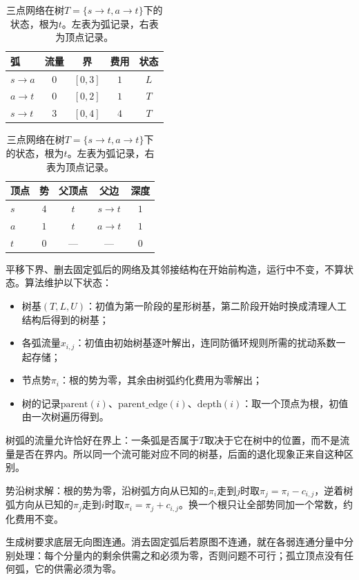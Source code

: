 \begin{table}[!htb]
  \centering\small
  \begin{tabular}{@{}lcccc@{}}
    \toprule
    弧 & 流量 & 界 & 费用 & 状态 \\
    \midrule
    $s\to a$ & $0$ & $[0,3]$ & $1$ & $L$ \\
    $a\to t$ & $0$ & $[0,2]$ & $1$ & $T$ \\
    $s\to t$ & $3$ & $[0,4]$ & $4$ & $T$ \\
    \bottomrule
  \end{tabular}\quad
  \begin{tabular}{@{}lcccc@{}}
    \toprule
    顶点 & 势 & 父顶点 & 父边 & 深度 \\
    \midrule
    $s$ & $4$ & $t$ & $s\to t$ & $1$ \\
    $a$ & $1$ & $t$ & $a\to t$ & $1$ \\
    $t$ & $0$ & — & — & $0$ \\
    \bottomrule
  \end{tabular}
  \caption{三点网络在树$T=\{s\to t,a\to t\}$下的状态，根为$t$。左表为弧记录，右表为顶点记录。}
  \label{tab:graph-opt-ns-state}
\end{table}

平移下界、删去固定弧后的网络及其邻接结构在开始前构造，运行中不变，不算状态。算法维护以下状态：
\begin{itemize}
  \item 树基$(T,L,U)$：初值为第一阶段的星形树基，第二阶段开始时换成清理人工结构后得到的树基；
  \item 各弧流量$x_{i,j}$：初值由初始树基逐叶解出，连同防循环规则所需的扰动系数一起存储；
  \item 节点势$\pi_i$：根的势为零，其余由树弧约化费用为零解出；
  \item 树的记录$\mathrm{parent}(i)$、$\mathrm{parent\_edge}(i)$、$\mathrm{depth}(i)$：取一个顶点为根，初值由一次树遍历得到。
\end{itemize}
树弧的流量允许恰好在界上：一条弧是否属于$T$取决于它在树中的位置，而不是流量是否在界内。所以同一个流可能对应不同的树基，后面的退化现象正来自这种区别。

势沿树求解：根的势为零，沿树弧方向从已知的$\pi_i$走到$j$时取$\pi_j=\pi_i-c_{i,j}$，逆着树弧方向从已知的$\pi_j$走到$i$时取$\pi_i=\pi_j+c_{i,j}$。换一个根只让全部势同加一个常数，约化费用不变。

生成树要求底层无向图连通。消去固定弧后若原图不连通，就在各弱连通分量中分别处理：每个分量内的剩余供需之和必须为零，否则问题不可行；孤立顶点没有任何弧，它的供需必须为零。

